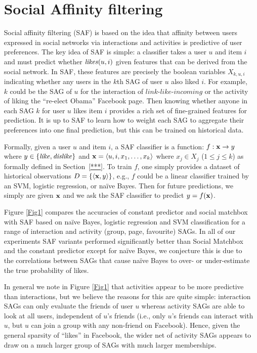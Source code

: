 \section{Social Affinity filtering}

Social affinity filtering (SAF) is based on the idea that affinity
between users expressed in social networks via interactions and
activities is predictive of user preferences.  The key idea of SAF is
simple: a classifier takes a user $u$ and item $i$ and must predict
whether $\likes(u,i)$ given features that can be derived from the
social network.  In SAF, these features are precisely the boolean
variables $X_{k,u,i}$ indicating whether any users in the $k$th SAG of
user $u$ also liked $i$.  For example, $k$ could be the SAG of $u$ for
the interaction of $\textit{link-like-incoming}$ or the activity of
liking the ``re-elect Obama'' Facebook page.  Then knowing whether
anyone in each SAG $k$ for user $u$ likes item $i$ provides a rich set
of fine-grained features for prediction.  It is up to SAF to learn how
to weight each SAG to aggregate their preferences into one final
prediction, but this can be trained on historical data.

Formally, given a user $u$ and item $i$, a SAF classifier is a
function: $f: \x \to y$ where $y \in \{ \like, \dislike \}$ and $\x =
\langle u,i,x_1,\ldots,x_k \rangle$ where $x_j \in X_j$ ($1 \leq j
\leq k$) as formally defined in Section~\ref{***}.  To train $f$, one
simply provides a dataset of historical observations $D = \{ \langle
\x,y \rangle \}$, e.g., $f$ could be a linear classifier trained by an
SVM, logistic regression, or na\"{i}ve Bayes.  Then for future
predictions, we simply are given $\x$ and we ask the SAF classifier to
predict $y = f(\x)$.

Figure \ref{Fig1} compares the accuracies of constant predictor and
social matchbox with SAF based on na\"{i}ve Bayes, logistic regression
and SVM classification for a range of interaction and activity (group,
page, favourite) SAGs.  In all of our experiments SAF variants
performed significantly better than Social Matchbox and the constant
predictor except for na\"{i}ve Bayes, we conjecture this is due to the
correlations between SAGs that cause na\"{i}ve Bayes to over- or
under-estimate the true probability of likes.

In general we note in Figure \ref{Fig1} that activities appear to be
more predictive than interactions, but we believe the reasons for this
are quite simple: interaction SAGs can only evaluate the friends of
user $u$ whereas activity SAGs are able to look at all users,
independent of $u$'s friends (i.e., only $u$'s friends can interact
with $u$, but $u$ can join a group with any non-friend on Facebook).
Hence, given the general sparsity of ``likes'' in Facebook, the wider
net of activity SAGs appears to draw on a much larger group of SAGs
with much larger memberships.

